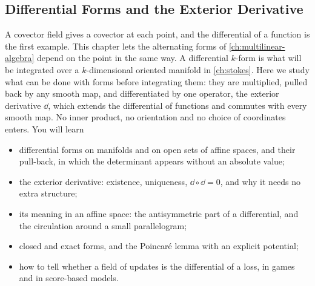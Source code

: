 \begin{notechapter}
\chapter{Differential Forms and the Exterior Derivative}
\label{ch:differential-forms}

\begin{chapterintro}
A covector field gives a covector at each point, and the differential of
a function is the first example. This chapter lets the alternating forms
of \cref{ch:multilinear-algebra} depend on the point in the same way. A
differential $k$-form is what will be integrated over a $k$-dimensional
oriented manifold in \cref{ch:stokes}. Here we study what can be done
with forms before integrating them: they are multiplied, pulled back by
any smooth map, and differentiated by one operator, the exterior
derivative $\dd$, which extends the differential of functions and
commutes with every smooth map. No inner product, no orientation and no
choice of coordinates enters. You will learn
\begin{itemize}[nosep]
  \item differential forms on manifolds and on open sets of affine
        spaces, and their pull-back, in which the determinant appears
        without an absolute value;
  \item the exterior derivative: existence, uniqueness,
        $\dd\circ\dd = 0$, and why it needs no extra structure;
  \item its meaning in an affine space: the antisymmetric part of a
        differential, and the circulation around a small parallelogram;
  \item closed and exact forms, and the Poincar\'e lemma with an
        explicit potential;
  \item how to tell whether a field of updates is the differential of a
        loss, in games and in score-based models.
\end{itemize}
\end{chapterintro}


\end{notechapter}
